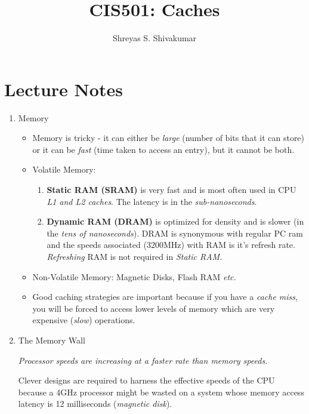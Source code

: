 \documentclass[12pt]{article}
\title{CIS501: Caches}
\author[1]{Shreyas S. Shivakumar}
\newenvironment{QandA}{\begin{enumerate}[label=\bfseries\arabic*.]\bfseries}
                      {\end{enumerate}}
\newenvironment{answered}{\par\quad\normalfont}{}
\begin{document}
\maketitle

\section{Lecture Notes}

\begin{QandA}
\item Memory
\begin{answered}
\vspace{-0.85cm}
\begin{itemize}
    \item Memory is tricky - it can either be \textit{large} (number of bits that it can store) or it can be \textit{fast} (time taken to access an entry), but it cannot be both.
    \item Volatile Memory:
    \begin{enumerate}
        \item \textbf{Static RAM (SRAM)} is very fast and is most often used in CPU \textit{L1 and L2 caches}. The latency is in the \textit{sub-nanoseconds}.
        \item \textbf{Dynamic RAM (DRAM)} is optimized for density and is slower (in the \textit{tens of nanoseconds}). DRAM is synonymous with regular PC ram and the speeds associated (3200MHz) with RAM is it's refresh rate. \textit{Refreshing} RAM is not required in \textit{Static RAM}.
    \end{enumerate}
    \item Non-Volatile Memory: Magnetic Disks, Flash RAM \textit{etc.}
    \item Good caching strategies are important because if you have a \textit{cache miss}, you will be forced to access lower levels of memory which are very expensive (\textit{slow}) operations.
\end{itemize}
\end{answered}

\item The Memory Wall
\begin{answered}
\textit{Processor speeds are increasing at a faster rate than memory speeds}. 

Clever designs are required to harness the effective speeds of the CPU because a 4GHz processor might be wasted on a system whose memory access latency is 12 milliseconds (\textit{magnetic disk}).
\end{answered}


\end{QandA}
\end{document}
